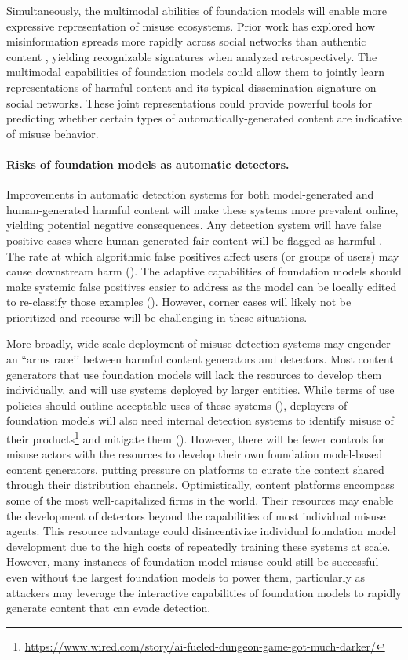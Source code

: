 Simultaneously, the multimodal abilities of foundation models will enable more expressive representation of misuse ecosystems. Prior work has explored how misinformation spreads more rapidly across social networks than authentic content \citep{Starbird2018,Vosoughi1146}, yielding recognizable signatures when analyzed retrospectively. The multimodal capabilities of foundation models could allow them to jointly learn representations of harmful content and its typical dissemination signature on social networks. These joint representations could provide powerful tools for predicting whether certain types of automatically-generated content are indicative of misuse behavior. 

\paragraph{Risks of foundation models as automatic detectors.}
Improvements in automatic detection systems for both model-generated and human-generated harmful content will make these systems more prevalent online, yielding potential negative consequences. Any detection system will have false positive cases where human-generated fair content will be flagged as harmful \citep{sap-etal-2019-risk,xu-etal-2021-detoxifying}. 
The rate at which algorithmic false positives affect users (or groups of users) may cause downstream harm (). The adaptive capabilities of foundation models should make systemic false positives easier to address as the model can be locally edited to re-classify those examples (). 
However, corner cases will likely not be prioritized and recourse will be challenging in these situations.

More broadly, wide-scale deployment of misuse detection systems may engender an ``arms race’’ between harmful content generators and detectors. Most content generators that use foundation models will lack the resources to develop them individually, and will use systems deployed by larger entities. While terms of use policies should outline acceptable uses of these systems (), deployers of foundation models will also need internal detection systems to identify misuse of their products\footnote{\url{https://www.wired.com/story/ai-fueled-dungeon-game-got-much-darker/}} and mitigate them (). 
However, there will be fewer controls for misuse actors with the resources to develop their own foundation model-based content generators, putting pressure on platforms to curate the content shared through their distribution channels. Optimistically, content platforms encompass some of the most well-capitalized firms in the world. Their resources may enable the development of  detectors beyond the capabilities of most individual misuse agents. 
This resource advantage could disincentivize individual foundation model development due to the high costs of repeatedly training these systems at scale. However, many instances of foundation model misuse could still be successful even without the largest foundation models to power them, particularly as attackers may leverage the interactive capabilities of foundation models to rapidly generate content that can evade detection.
